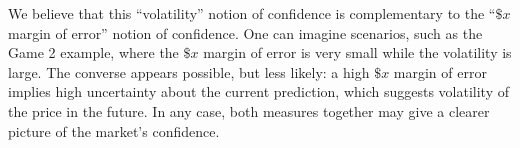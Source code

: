 \documentclass[sigconf,anonymous]{aamas}   %
\newcommand{\rupert}[1]{\ifnum\Chatty=1 \textcolor{red}   {Rupert: [#1]} \fi}
\begin{document}
We believe that this ``volatility'' notion of confidence is complementary to the ``$\$x$ margin of error'' notion of confidence.
One can imagine scenarios, such as the Game 2 example, where the $\$x$ margin of error is very small while the volatility is large.
The converse appears possible, but less likely: a high $\$x$ margin of error implies high uncertainty about the current prediction, which suggests volatility of the price in the future.
In any case, both measures together may give a clearer picture of the market's confidence.




\end{document}
